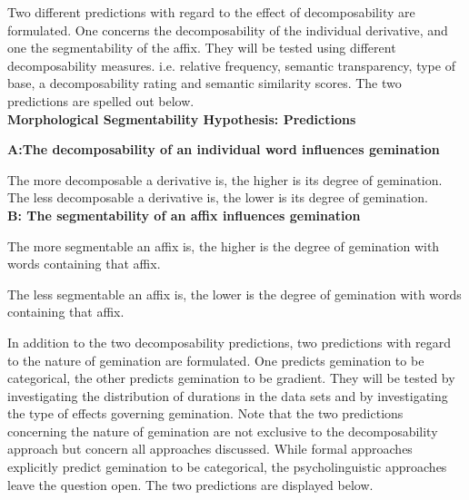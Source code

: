 {Two different predictions with regard to the effect of decomposability are formulated. One concerns the decomposability of the individual derivative, and one the segmentability of the affix. They will be tested using different decomposability measures. i.e.  relative frequency, semantic transparency, type of base, a decomposability rating and semantic similarity scores. The two predictions are spelled out below.\\


\noindent \textbf{Morphological Segmentability Hypothesis: Predictions}
\vspace{0.45 cm}	

\noindent	\textbf{A:\hspace{0.5cm}The decomposability of an individual word influences gemination} \vspace{0.2 cm}
   
\noindent  The more decomposable a derivative is, the higher is its degree of gemination. \\

\noindent The less decomposable a derivative is, the lower is its degree of gemination. \\


	



\noindent	\textbf{B: \hspace{0.5cm}The segmentability of an affix influences gemination} \vspace{0.2 cm}
	
	
\noindent	The more segmentable an affix is, the higher is the degree of gemination with words containing that affix. \vspace{0.2cm}
	
\noindent		The less segmentable an affix is, the lower is the degree of gemination with words 
		containing that affix. \\
		
		\vspace*{0.3cm}

In addition to the two decomposability predictions, two predictions with regard to the nature of gemination are formulated. One predicts gemination to be categorical, the other predicts gemination to be gradient. They will be tested by investigating the distribution of durations in the data sets and by investigating the type of effects governing gemination. Note that the two predictions concerning the nature of gemination are not exclusive to the decomposability approach but concern all approaches discussed. While formal approaches explicitly predict gemination to be categorical, the psycholinguistic approaches leave the question open. The two predictions are displayed below.\\


}
